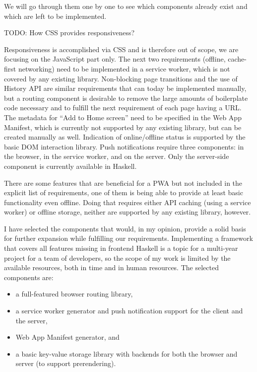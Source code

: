 \documentclass[english,odsaz]{fitthesis}
\begin{document}
We will go through them one by one to see which components already exist and
which are left to be implemented.

TODO: How CSS provides responsiveness?

Responsiveness is accomplished via CSS and is therefore out of scope, we are
focusing on the JavaScript part only. The next two requirements (offline,
cache-first networking) need to be implemented in a service worker, which is not
covered by any existing library. Non-blocking page transitions and the use of
History API are similar requirements that can today be implemented manually, but
a routing component is desirable to remove the large amounts of boilerplate code
necessary and to fulfill the next requirement of each page having a URL. The
metadata for ``Add to Home screen'' need to be specified in the Web App Manifest,
which is currently not supported by any existing library, but can be created
manually as well. Indication of online/offline status is supported by the basic
DOM interaction library. Push notifications require three components: in the
browser, in the service worker, and on the server. Only the server-side
component is currently available in Haskell.

There are some features that are beneficial for a PWA but not included in the
explicit list of requirements, one of them is being able to provide at least
basic functionality even offline. Doing that requires either API caching (using
a service worker) or offline storage, neither are supported by any existing
library, however.

I have selected the components that would, in my opinion, provide a solid basis
for further expansion while fulfilling our requirements. Implementing a
framework that covers all features missing in frontend Haskell is a topic for a
multi-year project for a team of developers, so the scope of my work is limited
by the available resources, both in time and in human resources. The selected
components are:

\begin{itemize}
\item a full-featured browser routing library,
\item a service worker generator and push notification support for the client and
the server,
\item Web App Manifest generator, and
\item a basic key-value storage library with backends for both the browser and
server (to support prerendering).
\end{itemize}
\end{document}
